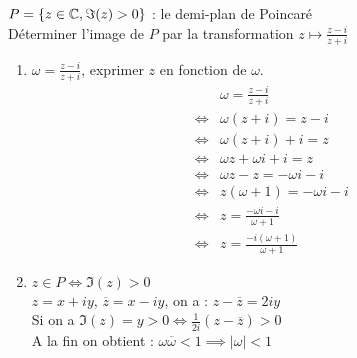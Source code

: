 \begin{exemple}
    $P = \left\{ z \in \mathbb{C}, \Im{(z)} > 0\right\}$ : le demi-plan de Poincaré    
    \\
    Déterminer l'image de $P$ par la transformation $z \mapsto \frac{z - i}{z + i}$
    \\
    \begin{enumerate}
        \item $\omega = \frac{z - i}{z + i}$, exprimer $z$ en fonction de $\omega$.
            \begin{align*}
                &\omega = \frac{z - i}{z + i} \\
                \iff &\omega (z + i) = z - i \\
                \iff &\omega (z + i) + i = z \\
                \iff &\omega z + \omega i + i = z \\
                \iff &\omega z - z = -\omega i - i \\
                \iff &z(\omega + 1) = -\omega i - i \\
                \iff &z = \frac{-\omega i - i}{\omega + 1} \\
                \iff &z = \frac{-i(\omega + 1)}{\omega + 1} 
            \end{align*}
        \item $z \in P \iff \Im{(z)} > 0$ 
            \\
            $z = x + iy$, $\overline{z} = x - iy$, on a : $z - \overline{z} = 2iy$ \\
            Si on a $\Im{(z)} = y > 0 \iff \frac{1}{2i}(z - \overline{z}) > 0$
            \\
            A la fin on obtient : $\omega\overline{\omega} < 1 \implies |\omega| < 1$
    \end{enumerate}
\end{exemple}

